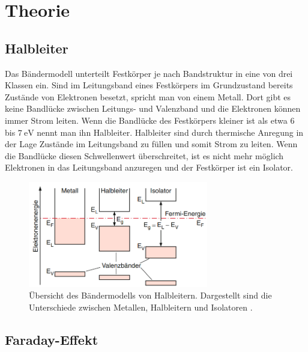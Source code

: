 \section{Theorie}
\label{sec:Theorie}

\subsection{Halbleiter}
\label{ssec:halbleiter}

Das Bändermodell unterteilt Festkörper je nach Bandstruktur in eine von drei Klassen ein.
Sind im Leitungsband eines Festkörpers im Grundzustand bereits Zustände von Elektronen besetzt, spricht man von einem Metall.
Dort gibt es keine Bandlücke zwischen Leitungs- und Valenzband und die Elektronen können immer Strom leiten.
Wenn die Bandlücke des Festkörpers kleiner ist als etwa $\qty{6}{}$ bis $\qty{7}{\eV}$ nennt man ihn Halbleiter.
Halbleiter sind durch thermische Anregung in der Lage Zustände im Leitungsband zu füllen und somit Strom zu leiten.
Wenn die Bandlücke diesen Schwellenwert überschreitet, ist es nicht mehr möglich Elektronen in das Leitungsband anzuregen und der Festkörper ist ein Isolator.

\begin{figure}
    \centering
    \includegraphics[width=0.7\textwidth]{figure/halbleiter.png}
    \caption{Übersicht des Bändermodells von Halbleitern. Dargestellt sind die Unterschiede zwischen Metallen, Halbleitern und Isolatoren \cite{demtroder}.}
    \label{fig:halbleiter}
\end{figure}

\subsection{Faraday-Effekt}
\label{ssec:faraday}